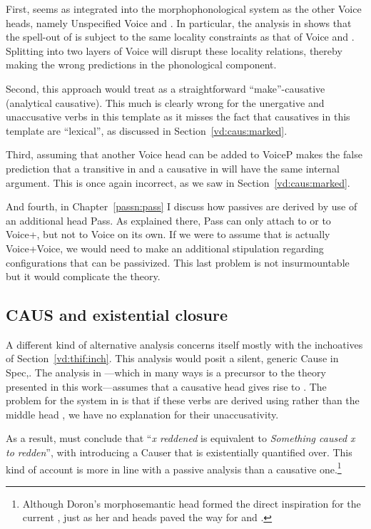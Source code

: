 First, {\vd} seems as integrated into the morphophonological system as the other Voice heads, namely Unspecified Voice and {\vz}. In particular, the analysis in \cite{kastner18nllt} shows that the spell-out of {\vd} is subject to the same locality constraints as that of Voice and {\vz}. Splitting {\vd} into two layers of Voice will disrupt these locality relations, thereby making the wrong predictions in the phonological component.

Second, this approach would treat {\thif} as a straightforward ``make''-causative (analytical causative). This much is clearly wrong for the unergative and unaccusative verbs in this template as it misses the fact that causatives in this template are ``lexical'', as discussed in Section~\ref{vd:caus:marked}. 

Third, assuming that another Voice head can be added to VoiceP makes the false prediction that a transitive in {\tkal} and a causative in {\thif} will have the same internal argument. This is once again incorrect, as we saw in Section~\ref{vd:caus:marked}.

And fourth, in Chapter~\ref{passn:pass} I discuss how passives are derived by use of an additional head Pass. As explained there, Pass can only attach to {\vd} or to Voice+{\va}, but not to Voice on its own. If we were to assume that {\vd} is actually Voice+Voice, we would need to make an additional stipulation regarding configurations that can be passivized. This last problem is not insurmountable but it would complicate the theory.

	
	\subsection{CAUS and existential closure} \label{vd:others:ed}
A different kind of alternative analysis concerns itself mostly with the inchoatives of Section~\ref{vd:thif:inch}. This analysis would posit a silent, generic Cause in Spec,{\vd}. The analysis in \citet[61]{doron03}---which in many ways is a precursor to the theory presented in this work---assumes that a causative head  gives rise to {\thif}. The problem for the system in \cite{doron03} is that if these verbs are derived using  rather than the middle head , we have no explanation for their unaccusativity.

As a result, \citet[62]{doron03} must conclude that ``\emph{x reddened} is equivalent to \emph{Something caused x to redden}'', with  introducing a Causer that is existentially quantified over. This kind of account is more in line with a passive analysis than a causative one.\footnote{Although Doron's morphosemantic head formed the direct inspiration for the current {\vd}, just as her  and  heads paved the way for {\vz} and {\va}.}

